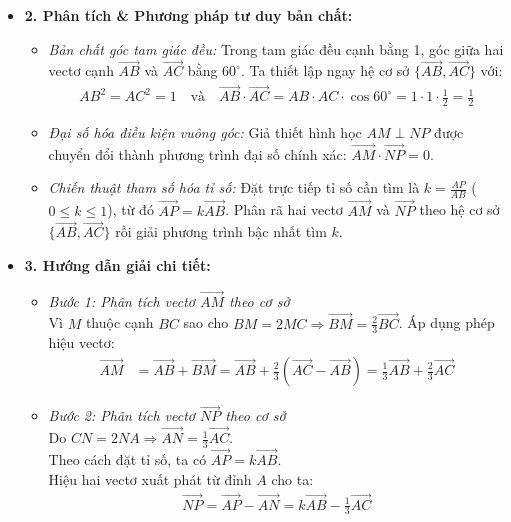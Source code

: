 \documentclass[12pt,a4paper]{article}
\begin{document}
\begin{itemize}
\begin{itemize}
        \item \textbf{2. Phân tích \& Phương pháp tư duy bản chất:}
        \begin{itemize}
            \item \textit{Bản chất góc tam giác đều:} Trong tam giác đều cạnh bằng 1, góc giữa hai vectơ cạnh $\vec{AB}$ và $\vec{AC}$ bằng $60^\circ$. Ta thiết lập ngay hệ cơ sở $\{\vec{AB}, \vec{AC}\}$ với:
            \begin{align*}
                AB^2 = AC^2 = 1 \quad \text{và} \quad \vec{AB} \cdot \vec{AC} = AB \cdot AC \cdot \cos 60^\circ = 1 \cdot 1 \cdot \frac{1}{2} = \frac{1}{2}
            \end{align*}
            \item \textit{Đại số hóa điều kiện vuông góc:} Giả thiết hình học $AM \perp NP$ được chuyển đổi thành phương trình đại số chính xác: $\vec{AM} \cdot \vec{NP} = 0$.
            \item \textit{Chiến thuật tham số hóa tỉ số:} Đặt trực tiếp tỉ số cần tìm là $k = \frac{AP}{AB}$ ($0 \le k \le 1$), từ đó $\vec{AP} = k\vec{AB}$. Phân rã hai vectơ $\vec{AM}$ và $\vec{NP}$ theo hệ cơ sở $\{\vec{AB}, \vec{AC}\}$ rồi giải phương trình bậc nhất tìm $k$.
        \end{itemize}

        \item \textbf{3. Hướng dẫn giải chi tiết:}
        \begin{itemize}
            \item \textit{Bước 1: Phân tích vectơ $\vec{AM}$ theo cơ sở}\\
            Vì $M$ thuộc cạnh $BC$ sao cho $BM = 2MC \Longrightarrow \vec{BM} = \frac{2}{3}\vec{BC}$. Áp dụng phép hiệu vectơ:
            \begin{align*}
                \vec{AM} &= \vec{AB} + \vec{BM} = \vec{AB} + \frac{2}{3}(\vec{AC} - \vec{AB}) = \frac{1}{3}\vec{AB} + \frac{2}{3}\vec{AC}
            \end{align*}

            \item \textit{Bước 2: Phân tích vectơ $\vec{NP}$ theo cơ sở}\\
            Do $CN = 2NA \Longrightarrow \vec{AN} = \frac{1}{3}\vec{AC}$.\\
            Theo cách đặt tỉ số, ta có $\vec{AP} = k\vec{AB}$.\\
            Hiệu hai vectơ xuất phát từ đỉnh $A$ cho ta:
            \begin{align*}
                \vec{NP} = \vec{AP} - \vec{AN} = k\vec{AB} - \frac{1}{3}\vec{AC}
            \end{align*}


\end{itemize}
\end{itemize}
\end{itemize}
\end{document}
